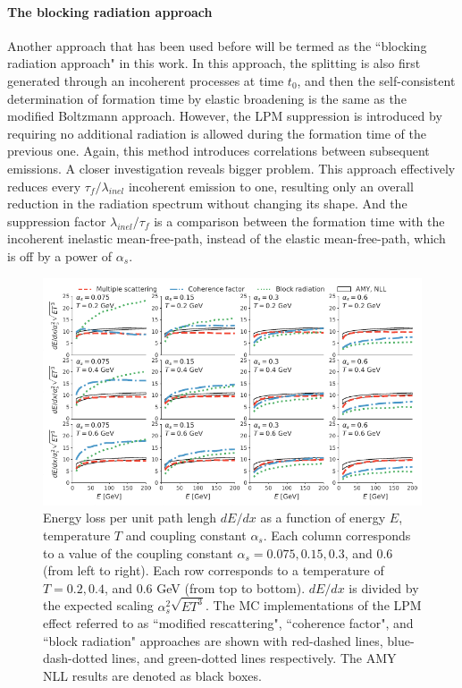 \documentclass[aps, prc, reprint, amsmath, groupedaddress, nofootinbib]{revtex4-1}
\begin{document}
\begin{appendices}
\paragraph{The blocking radiation approach}
Another approach that has been used before will be termed as the ``blocking radiation approach" in this work.
In this approach, the splitting is also first generated through an incoherent processes at time $t_0$, and then the self-consistent determination of formation time by elastic broadening is the same as the modified Boltzmann approach.
However, the LPM suppression is introduced by requiring no additional radiation is allowed during the formation time of the previous one.
Again, this method introduces correlations between subsequent emissions.
A closer investigation reveals bigger problem.
This approach effectively reduces every $\tau_f/\lambda_{inel}$ incoherent emission to one, resulting only an overall reduction in the radiation spectrum without changing its shape.
And the suppression factor $\lambda_{inel}/\tau_f$ is a comparison between  the formation time with the incoherent inelastic mean-free-path, instead of the elastic mean-free-path, which is off by a power of $\alpha_s$.

\begin{figure}
\centering
\includegraphics[width=1.\textwidth]{Eloss_infinite.pdf}
\caption{Energy loss per unit path lengh $dE/dx$ as a function of energy $E$, temperature $T$ and coupling constant $\alpha_s$. Each column corresponds to a value of the coupling constant $\alpha_s = 0.075, 0.15, 0.3$, and $0.6$ (from left to right). Each row corresponds to a temperature of $T = 0.2, 0.4$, and $0.6$ GeV (from top to bottom). $dE/dx$ is divided by the expected scaling $\alpha_s^2 \sqrt{ET^3}$. The MC implementations of the LPM effect referred to as ``modified rescattering", ``coherence factor", and ``block radiation" approaches are shown with red-dashed lines, blue-dash-dotted lines, and green-dotted lines respectively. The AMY NLL results are denoted as black boxes.}
\label{fig:eloss-inf}
\end{figure}



\end{appendices}
\end{document}
